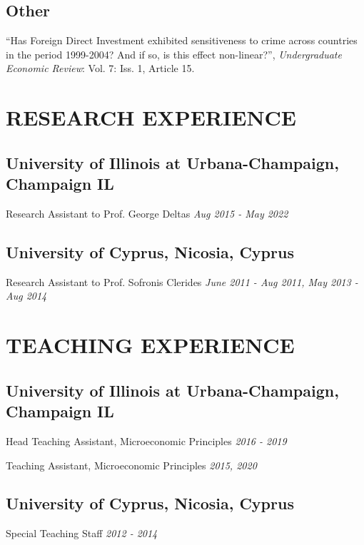 \documentclass{article}
\begin{document}
\subsection{Other}
``Has Foreign Direct Investment exhibited sensitiveness to crime across countries in the period 1999-2004? And if so, is this effect non-linear?'', \emph{Undergraduate Economic Review}: Vol. 7: Iss. 1, Article 15. %


\section{RESEARCH EXPERIENCE}
\subsection{\textbf{University of Illinois at Urbana-Champaign}, Champaign IL}
Research Assistant to Prof. George Deltas \hfill \emph{Aug 2015 - May 2022}

\subsection{\textbf{University of Cyprus}, Nicosia, Cyprus}
Research Assistant to Prof. Sofronis Clerides \hfill \emph{June 2011 - Aug 2011, May 2013 - Aug 2014}


\section{TEACHING EXPERIENCE}
\subsection{\textbf{University of Illinois at Urbana-Champaign}, Champaign IL}
Head Teaching Assistant, Microeconomic Principles \hfill \emph{2016 - 2019}

Teaching Assistant, Microeconomic Principles \hfill \emph{2015, 2020}

\subsection{\textbf{University of Cyprus}, Nicosia, Cyprus}
Special Teaching Staff \hfill \emph{2012 - 2014}

\end{document}
